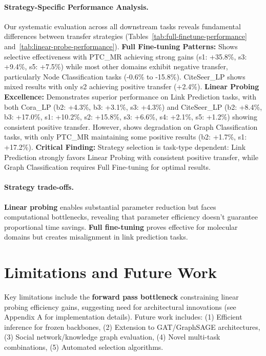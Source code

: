\documentclass[11pt]{article}
\begin{document}
\paragraph{Strategy-Specific Performance Analysis.} Our systematic evaluation across all downstream tasks reveals fundamental differences between transfer strategies (Tables~\ref{tab:full-finetune-performance} and~\ref{tab:linear-probe-performance}). \textbf{Full Fine-tuning Patterns:} Shows selective effectiveness with PTC\_MR achieving strong gains (s1: +35.8\%, s3: +9.4\%, s5: +7.5\%) while most other domains exhibit negative transfer, particularly Node Classification tasks (-0.6\% to -15.8\%). CiteSeer\_LP shows mixed results with only s2 achieving positive transfer (+2.4\%). \textbf{Linear Probing Excellence:} Demonstrates superior performance on Link Prediction tasks, with both Cora\_LP (b2: +4.3\%, b3: +3.1\%, s3: +4.3\%) and CiteSeer\_LP (b2: +8.4\%, b3: +17.0\%, s1: +10.2\%, s2: +15.8\%, s3: +6.6\%, s4: +2.1\%, s5: +1.2\%) showing consistent positive transfer. However, shows degradation on Graph Classification tasks, with only PTC\_MR maintaining some positive results (b2: +1.7\%, s1: +17.2\%). \textbf{Critical Finding:} Strategy selection is task-type dependent: Link Prediction strongly favors Linear Probing with consistent positive transfer, while Graph Classification requires Full Fine-tuning for optimal results.


\paragraph{Strategy trade-offs.} \textbf{Linear probing} enables substantial parameter reduction but faces computational bottlenecks, revealing that parameter efficiency doesn't guarantee proportional time savings. \textbf{Full fine-tuning} proves effective for molecular domains but creates misalignment in link prediction tasks.


\section{Limitations and Future Work}

Key limitations include the \textbf{forward pass bottleneck} constraining linear probing efficiency gains, suggesting need for architectural innovations (see Appendix A for implementation details). Future work includes: (1) Efficient inference for frozen backbones, (2) Extension to GAT/GraphSAGE architectures, (3) Social network/knowledge graph evaluation, (4) Novel multi-task combinations, (5) Automated selection algorithms.
\end{document}
